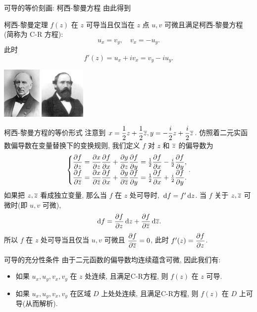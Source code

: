 \begin{frame}{可导的等价刻画: 柯西-黎曼方程}
	\onslide<+->
	由此得到
	\onslide<+->
	\begin{second}{柯西-黎曼定理}
		$f(z)$ 在 $z$ 可导当且仅当在 $z$ 点 $u,v$ 可微且满足柯西-黎曼方程 (简称为 C-R 方程):
		\[u_x=v_y,\quad v_x=-u_y.\]
		此时
		\[f'(z)=u_x+iv_x=v_y-iu_y.\]
	\end{second}

	\onslide<+->
	\begin{center}
		\includegraphics[height=25mm]{../image/Cauchy.jpeg}
		\hspace{2cm}
		\includegraphics[height=25mm]{../image/Riemann.jpeg}
	\end{center}
\end{frame}


\begin{frame}{柯西-黎曼方程的等价形式\noexer}
	\onslide<+->
	注意到 $x=\dfrac12z+\dfrac12\overline z,y=-\dfrac i2z+\dfrac i2\overline z$.
	\onslide<+->
	仿照着二元实函数偏导数在变量替换下的变换规则, 我们定义 $f$ 对 $z$ 和 $\overline z$ 的偏导数为
	\[\laeq{
		\dpp fz=\dpp xz\dpp fx+\dpp yz\dpp fy
		=\frac12\dpp fx-\frac i2\dpp fy,\\
		\dpp f{\ov z}=\dpp x{\ov z}\dpp fx+\dpp y{\ov z}\dpp fy
		=\frac12\dpp fx+\frac i2\dpp fy.
	}.\]
	\onslide<+->
	如果把 $z,\overline z$ 看成独立变量, 那么当 $f$ 在 $z$ 处可导时,
	$\,\mathrm{d} f=f'\,\mathrm{d} z$.
	当 $f$ 关于 $z,\overline z$ 可微时(即 $u,v$ 可微),
	\[\,\mathrm{d} f=\dfrac{\partial f}{\partial z}\,\mathrm{d} z+\dfrac{\partial f}{\partial \overline z}\,\mathrm{d}\overline z.\]
	\onslide<+->
	所以 \alert{$f$ 在 $z$ 处可导当且仅当 $u,v$ 可微且 $\dfrac{\partial f}{\partial \overline z}=0$, 此时 $f'(z)=\dfrac{\partial f}{\partial z}$.}
\end{frame}


\begin{frame}{可导的充分性条件}
	\onslide<+->
	由于二元函数的偏导数均连续蕴含可微, 因此我们有:

	\onslide<+->
	\begin{theorem}
		\begin{itemize}
			\item 如果 $u_x,u_y,v_x,v_y$ 在 $z$ 处连续, 且满足C-R方程, 则 $f(z)$ 在 $z$ 可导.
			\item 如果 $u_x,u_y,v_x,v_y$ 在区域 $D$ 上处处连续, 且满足C-R方程, 则 $f(z)$ 在 $D$ 上可导(从而解析).
		\end{itemize}
	\end{theorem}
\end{frame}


